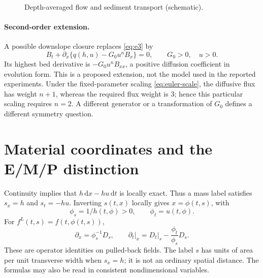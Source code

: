 \documentclass[11pt,a4paper,oneside]{report}
\numberwithin{equation}{chapter}
\newcommand{\dd}{\mathrm d}
\begin{document}
\begin{figure}[htbp]\centering
{}
\caption{Depth-averaged flow and sediment transport (schematic).}\label{fig:physical}
\end{figure}

\paragraph{Second-order extension.}
A possible downslope closure replaces \eqref{eq:e3} by
\begin{equation}\label{eq:diffusive}
B_t+\partial_x\{q(h,u)-G_0u^nB_x\}=0,\qquad G_0>0,\quad u>0.
\end{equation}
Its highest bed derivative is $-G_0u^nB_{xx}$, a positive diffusion coefficient in evolution form. This is a proposed extension, not the model used in the reported experiments. Under the fixed-parameter scaling \eqref{eq:euler-scale}, the diffusive flux has weight $n+1$, whereas the required flux weight is $3$; hence this particular scaling requires $n=2$. A different generator or a transformation of $G_0$ defines a different symmetry question.

\section{Material coordinates and the E/M/P distinction}
Continuity implies that $h\,\dd x-hu\,\dd t$ is locally exact. Thus a mass label satisfies $s_x=h$ and $s_t=-hu$. Inverting $s(t,x)$ locally gives $x=\phi(t,s)$, with
\begin{equation}
\phi_s=1/h(t,\phi)>0,\qquad \phi_t=u(t,\phi).
\end{equation}
For $f^L(t,s)=f(t,\phi(t,s))$,
\begin{equation}\label{eq:chain}
\partial_x=\phi_s^{-1}D_s,\qquad
\partial_t\big|_x=D_t\big|_s-\frac{\phi_t}{\phi_s}D_s.
\end{equation}
These are operator identities on pulled-back fields. The label $s$ has units of area per unit transverse width when $s_x=h$; it is not an ordinary spatial distance. The formulas may also be read in consistent nondimensional variables.
\end{document}
